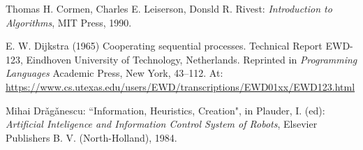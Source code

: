 {\begin{thebibliography}{}

 Thomas H. Cormen, Charles E. Leiserson, Donsld R. Rivest: {\em Introduction to Algorithms}, MIT Press, 1990.



 E. W. Dijkstra (1965) Cooperating sequential processes. Technical Report EWD-123, Eindhoven University of Technology, Netherlands. Reprinted in {\em  Programming Languages} Academic Press, New York, 43--112. At: \url{https://www.cs.utexas.edu/users/EWD/transcriptions/EWD01xx/EWD123.html}


 Mihai Dr\v ag\v anescu: ``Information,
Heuristics, Creation", in Plauder, I. (ed): {\em Artificial Inteligence and Information Control System of Robots}, Elsevier Publishers B. V. (North-Holland), 1984.







\end{thebibliography}}
